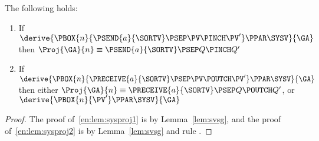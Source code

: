 \begin{lemma}\label{lem:sysproj}
  The following holds:
  \begin{enumerate}
  \item \label{en:lem:sysproj1}
    If $\derive{\PBOX{n}{\PSEND{a}{\SORTV} \PSEP \PV \PINCH \PV'} \PPAR \SYSV}{\GA}$
    then $\Proj{\GA}{n} \equiv \PSEND{a}{\SORTV} \PSEP Q \PINCH Q' $
   
  \item \label{en:lem:sysproj2}
    If $\derive{\PBOX{n}{\PRECEIVE{a}{\SORTV} \PSEP \PV \POUTCH \PV'} \PPAR \SYSV}{\GA}$
    then either $\Proj{\GA}{n} \equiv \PRECEIVE{a}{\SORTV} \PSEP Q \POUTCH Q'$,
    or  $\derive{\PBOX{n}{\PV'} \PPAR \SYSV}{\GA}$
  \end{enumerate}
\end{lemma}
\begin{proof}
  The proof of~\ref{en:lem:sysproj1} is by Lemma~\ref{lem:svsg},
  and the proof of~\ref{en:lem:sysproj2}
  is by Lemma~\ref{lem:svsg} and rule .
\end{proof}
\medskip






\thmbisim

